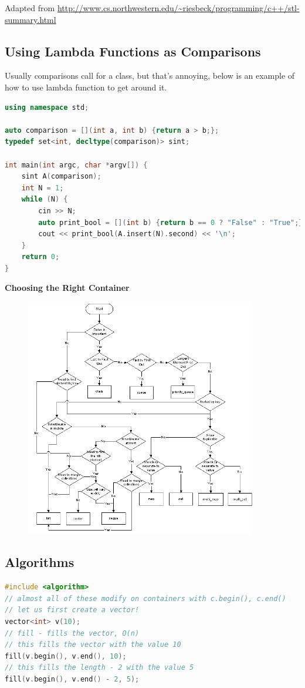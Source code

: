 \documentclass[12 pt, twoside] {article}
\begin{document}
{Adapted from \url{http://www.cs.northwestern.edu/~riesbeck/programming/c++/stl-summary.html}

\subsection*{Using Lambda Functions as Comparisons}
Usually comparisons call for a class, but that's annoying, below is an example
of how to use lambda function to get around it.
\begin{lstlisting}[language=C++]
using namespace std;

auto comparison = [](int a, int b) {return a > b;};
typedef set<int, decltype(comparison)> sint;

int main(int argc, char *argv[]) {
    sint A(comparison);
    int N = 1;
    while (N) {
        cin >> N;
        auto print_bool = [](int b) {return b == 0 ? "False" : "True";};
        cout << print_bool(A.insert(N).second) << '\n';
    }
    return 0;
}
\end{lstlisting}
\textbf{Choosing the Right Container}
\begin{figure}[h]
    \centering
    \includegraphics[width=0.9\textwidth]{containerchoice.png}
\end{figure}
\subsection*{Algorithms}
\begin{lstlisting}[language=c++]
#include <algorithm>
// almost all of these modify on containers with c.begin(), c.end()
// let us first create a vector!
vector<int> v(10);
// fill - fills the vector, O(n)
// this fills the vector with the value 10
fill(v.begin(), v.end(), 10);
// this fills the length - 2 with the value 5
fill(v.begin(), v.end() - 2, 5);


\end{lstlisting}}
\end{document}
